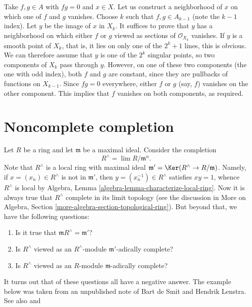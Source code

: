 \medskip\noindent
Take $f, g \in A$ with $fg = 0$ and $x \in X$. Let us construct a
neighborhood of $x$ on which one of $f$ and $g$ vanishes. Choose $k$
such that $f, g \in A_{k - 1}$ (note the $k - 1$ index).
Let $y$ be the image of $x$ in $X_k$. It suffices to prove that $y$ has
a neighborhood on which either $f$ or $g$ viewed as sections of
$\mathcal{O}_{X_k}$ vanishes.
If $y$ is a smooth point of $X_k$, that is, it lies on only one of the
$2^k + 1$ lines, this is obvious. We can therefore assume that $y$ is one
of the $2^k$ singular points, so two components of $X_k$ pass through
$y$. However, on one of these two components (the one with odd index),
both $f$ and $g$ are constant, since they are pullbacks of functions on
$X_{k - 1}$. Since $fg = 0$ everywhere, either $f$ or $g$ (say, $f$)
vanishes on the other component.
This implies that $f$ vanishes on both components, as required.






\section{Noncomplete completion}
\label{section-noncomplete-completion}

\noindent
Let $R$ be a ring and let $\mathfrak m$ be a maximal ideal. Consider the
completion
$$
R^\wedge = \lim R/\mathfrak m^n.
$$
Note that $R^\wedge$ is a local ring with maximal ideal
$\mathfrak m' = \Ker(R^\wedge \to R/\mathfrak m)$.
Namely, if $x = (x_n) \in R^\wedge$ is not in $\mathfrak m'$, then
$y = (x_n^{-1}) \in R^\wedge$ satisfies $xy = 1$, whence $R^\wedge$ is local by
Algebra, Lemma \ref{algebra-lemma-characterize-local-ring}. Now it is
always true that $R^\wedge$ complete in its limit topology (see the
discussion in
More on Algebra, Section \ref{more-algebra-section-topological-ring}).
But beyond that, we have the following questions:
\begin{enumerate}
\item Is it true that $\mathfrak m R^\wedge = \mathfrak m'$?
\item Is $R^\wedge$ viewed as an $R^\wedge$-module $\mathfrak m'$-adically
complete?
\item Is $R^\wedge$ viewed as an $R$-module $\mathfrak m$-adically complete?
\end{enumerate}
It turns out that of these questions all have a negative answer.
The example below was taken from an unpublished note of
Bart de Smit and Hendrik Lenstra. See also
\cite[Exercise III.2.12]{Bourbaki-CA} and
\cite[Example 1.8]{Yekutieli}

